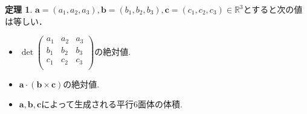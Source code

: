 \documentclass[dvipdfmx,a4paper,11pt]{article}
\newcommand{\R}{\mathbb{R}}
\theoremstyle{definition}
\newtheorem{thm}{定理}
\begin{document}
 \begin{tcolorbox}[
    colback = white,
    colframe = green!35!black,
    fonttitle = \bfseries,
    breakable = true]
    \begin{thm}
$\bm{a}=(a_1, a_2, a_3), \bm{b}=(b_1, b_2, b_3), \bm{c}=(c_1, c_2, c_3)\in \R^3$とすると次の値は等しい．
\begin{itemize}
\item $\det
\begin{pmatrix}
a_1& a_2 & a_3\\
b_1& b_2 & b_3\\
c_1& c_2 & c_3\\
\end{pmatrix}$の絶対値.
\item $\bm{a} \cdot (\bm{b} \times \bm{c})$の絶対値.
\item $\bm{a}, \bm{b}, \bm{c}$によって生成される平行6面体の体積.
\end{itemize}
\end{thm}
 \end{tcolorbox}
 
 
\end{document}
